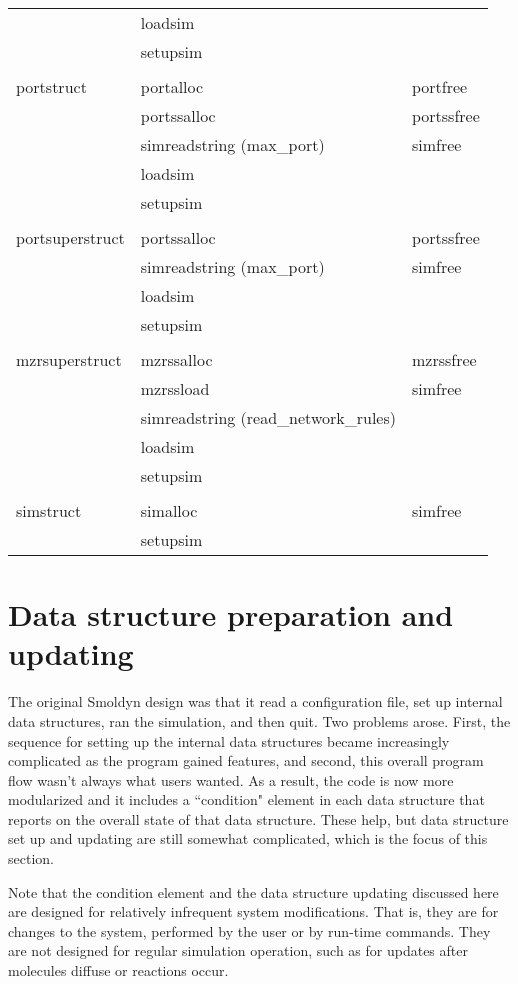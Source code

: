 \documentclass {book}
\begin{document}
\begin{ttfamily}
\begin{longtable}[c]{lll}
&loadsim\\
&setupsim\\
\\
portstruct&portalloc&portfree\\
&portssalloc&portssfree\\
&simreadstring (max\_port)&simfree\\
&loadsim\\
&setupsim\\
\\
portsuperstruct&portssalloc&portssfree\\
&simreadstring (max\_port)&simfree\\
&loadsim\\
&setupsim\\
\\
mzrsuperstruct&mzrssalloc&mzrssfree\\
&mzrssload&simfree\\
&simreadstring (read\_network\_rules)\\
&loadsim\\
&setupsim\\
\\
simstruct&simalloc&simfree\\
&setupsim\\
\end{longtable}
\end{ttfamily}

\section{Data structure preparation and updating}

The original Smoldyn design was that it read a configuration file, set up internal data structures, ran the simulation, and then quit.  Two problems arose.  First, the sequence for setting up the internal data structures became increasingly complicated as the program gained features, and second, this overall program flow wasn't always what users wanted.  As a result, the code is now more modularized and it includes a ``condition" element in each data structure that reports on the overall state of that data structure.  These help, but data structure set up and updating are still somewhat complicated, which is the focus of this section.

Note that the condition element and the data structure updating discussed here are designed for relatively infrequent system modifications.  That is, they are for changes to the system, performed by the user or by run-time commands.  They are not designed for regular simulation operation, such as for updates after molecules diffuse or reactions occur.
\end{document}
